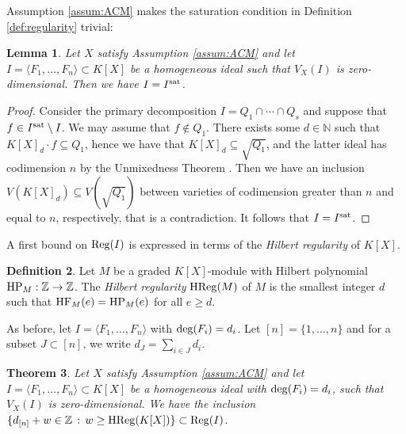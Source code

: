 \documentclass[12pt]{article}
\newtheorem{thm}{Theorem}[section]
\newtheorem{lemm}[thm]{Lemma}
\theoremstyle{definition}
\newtheorem{defn}[thm]{Definition}
\theoremstyle{remark}
\newcommand{\numberset}{\mathbb}
\newcommand{\N}{\numberset{N}}
\begin{document}
Assumption \ref{assum:ACM} makes the saturation condition in Definition \ref{def:regularity} trivial: 
\begin{lemm} \label{lem:IisIsat}
Let $X$ satisfy Assumption \ref{assum:ACM} and let $I = \langle F_1, \ldots, F_n \rangle \subset K[X] $ be a homogeneous ideal such that $V_X(I)$ is zero-dimensional. Then we have $I=I^{\rm sat}$.
\end{lemm}
\begin{proof}
Consider the primary decomposition $I=Q_1 \cap \cdots \cap Q_s$ and suppose that $f\in I^{\rm sat}\setminus I $. We may assume that $f\not\in Q_1$. There exists some $d\in \N$ such that $K[X]_d\cdot f\subseteq Q_1$, hence we have that $K[X]_d\subseteq \sqrt{Q_1}$, and the latter ideal has codimension $n$ by the Unmixedness Theorem \cite[Corollary 18.14]{eisenbud1995commutative}. Then we have an inclusion $V(K[X]_d)\subseteq V(\sqrt{Q_1})$ between varieties of codimension greater than $n$ and equal to $n$, respectively, that is a contradiction. It follows that $I=I^{\rm sat}$.
\end{proof}
A first bound on ${\rm Reg}(I)$ is expressed in terms of the \emph{Hilbert regularity} of $K[X]$.
\begin{defn}\label{def:hilbreg}
Let $M$ be a graded $K[X]$-module with Hilbert polynomial ${\rm HP}_M:\mathbb{Z} \rightarrow \mathbb{Z}$. The \emph{Hilbert regularity} ${\rm HReg}(M)$ of $M$ is the smallest integer $d$ such that ${\rm HF}_M(e) = {\rm HP}_M(e)$ for all $e \geq d$.
\end{defn}
As before, let $I = \langle F_1, \ldots, F_n \rangle$ with ${\rm deg}(F_i) = d_i$. Let $[n] = \{ 1, \ldots, n \}$ and for a subset $J \subset [n]$, we write $d_J = \sum_{i \in J} d_i$. 
\begin{thm} \label{thm:regfromhreg}
    Let $X$ satisfy Assumption \ref{assum:ACM} and let $I = \langle F_1, \ldots, F_n \rangle \subset K[X]$ be a homogeneous ideal with ${\rm deg}(F_i) = d_i$, such that $V_X(I)$ is zero-dimensional. We have the inclusion $\{d_{[n]} + w \in \mathbb{Z} \, : \, w \geq {\rm HReg}(K[X]) \} \subset {\rm Reg}(I)$.
\end{thm}
\end{document}
